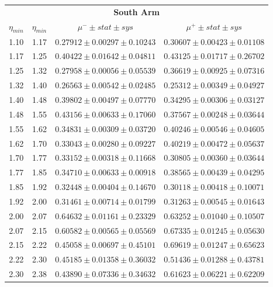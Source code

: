 \begin{table}
  \centering
  \begin{tabular}{cccc}
    \toprule
    \multicolumn{4}{c}{\textbf{South Arm}} \\
    \textbf{$\eta_{min}$} & 
    \textbf{$\eta_{min}$} & 
    \textbf{$\mu^{-}\pm stat \pm sys$} & 
    \textbf{$\mu^{+}\pm stat \pm sys$} \\
    \midrule
    1.10 & 1.17 & $0.27912 \pm 0.00297 \pm 0.10243$ & $0.30607 \pm 0.00423 \pm 0.01108$ \\
    1.17 & 1.25 & $0.40422 \pm 0.01642 \pm 0.04811$ & $0.43125 \pm 0.01717 \pm 0.26702$ \\
    1.25 & 1.32 & $0.27958 \pm 0.00056 \pm 0.05539$ & $0.36619 \pm 0.00925 \pm 0.07316$ \\
    1.32 & 1.40 & $0.26563 \pm 0.00542 \pm 0.02485$ & $0.25312 \pm 0.00349 \pm 0.04927$ \\
    1.40 & 1.48 & $0.39802 \pm 0.00497 \pm 0.07770$ & $0.34295 \pm 0.00306 \pm 0.03127$ \\
    1.48 & 1.55 & $0.43156 \pm 0.00633 \pm 0.17060$ & $0.37567 \pm 0.00248 \pm 0.03644$ \\
    1.55 & 1.62 & $0.34831 \pm 0.00309 \pm 0.03720$ & $0.40246 \pm 0.00546 \pm 0.04605$ \\
    1.62 & 1.70 & $0.33043 \pm 0.00280 \pm 0.09227$ & $0.40219 \pm 0.00472 \pm 0.05637$ \\
    1.70 & 1.77 & $0.33152 \pm 0.00318 \pm 0.11668$ & $0.30805 \pm 0.00360 \pm 0.03644$ \\
    1.77 & 1.85 & $0.34710 \pm 0.00633 \pm 0.00918$ & $0.38565 \pm 0.00439 \pm 0.04295$ \\
    1.85 & 1.92 & $0.32448 \pm 0.00404 \pm 0.14670$ & $0.30118 \pm 0.00418 \pm 0.10071$ \\
    1.92 & 2.00 & $0.31461 \pm 0.00714 \pm 0.01799$ & $0.31263 \pm 0.00545 \pm 0.01643$ \\
    2.00 & 2.07 & $0.64632 \pm 0.01161 \pm 0.23329$ & $0.63252 \pm 0.01040 \pm 0.10507$ \\
    2.07 & 2.15 & $0.60582 \pm 0.00565 \pm 0.05569$ & $0.67335 \pm 0.01245 \pm 0.05630$ \\
    2.15 & 2.22 & $0.45058 \pm 0.00697 \pm 0.45101$ & $0.69619 \pm 0.01247 \pm 0.65623$ \\
    2.22 & 2.30 & $0.45185 \pm 0.01358 \pm 0.36032$ & $0.51436 \pm 0.01288 \pm 0.43781$ \\
    2.30 & 2.38 & $0.43890 \pm 0.07336 \pm 0.34632$ & $0.61623 \pm 0.06221 \pm 0.62209$ \\

\end{tabular}
\end{table}
